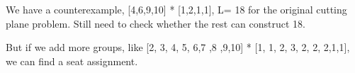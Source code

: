 


We have a counterexample, [4,6,9,10] * [1,2,1,1], L= 18 for the original cutting plane problem. Still need to check whether the rest can construct 18.

But if we add more groups, like [2, 3, 4, 5, 6,7 ,8 ,9,10] * [1, 1, 2, 3, 2, 2, 2,1,1], we can find a seat assignment.

%
%

%



